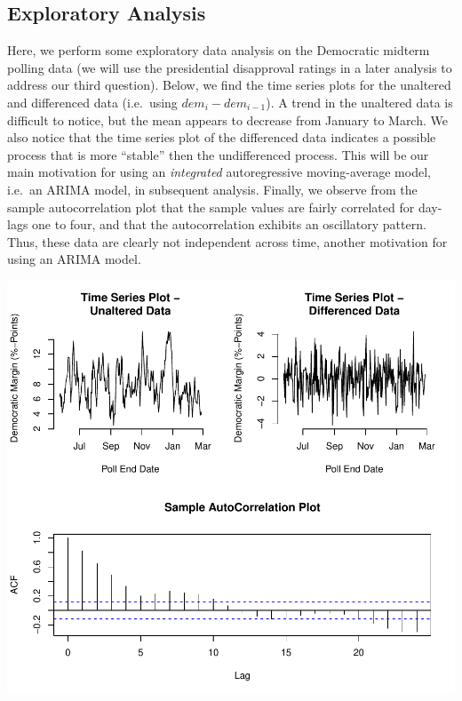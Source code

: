 \documentclass[]{article}
\begin{document}
\subsection{Exploratory Analysis}\label{exploratory-analysis}

Here, we perform some exploratory data analysis on the Democratic
midterm polling data (we will use the presidential disapproval ratings
in a later analysis to address our third question). Below, we find the
time series plots for the unaltered and differenced data (i.e.~using
\(dem_i - dem_{i-1}\)). A trend in the unaltered data is difficult to
notice, but the mean appears to decrease from January to March. We also
notice that the time series plot of the differenced data indicates a
possible process that is more ``stable'' then the undifferenced process.
This will be our main motivation for using an \emph{integrated}
autoregressive moving-average model, i.e.~an ARIMA model, in subsequent
analysis. Finally, we observe from the sample autocorrelation plot that
the sample values are fairly correlated for day-lags one to four, and
that the autocorrelation exhibits an oscillatory pattern. Thus, these
data are clearly not independent across time, another motivation for
using an ARIMA model.

\begin{center}\includegraphics{midterm_project_final_files/figure-latex/eda-1} \end{center}
\end{document}
